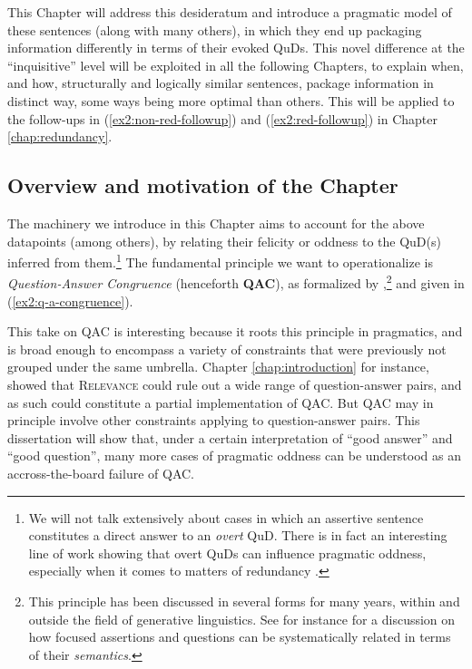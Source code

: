This Chapter will address this desideratum and introduce a pragmatic model of these sentences (along with many others), in which they end up packaging information differently in terms of their evoked QuDs. This novel difference at the ``inquisitive'' level will be exploited in all the following Chapters, to explain when, and how, structurally and logically similar sentences, package information in distinct way, some ways being more optimal than others. This will be applied to the follow-ups in (\ref{ex2:non-red-followup}) and (\ref{ex2:red-followup}) in Chapter \ref{chap:redundancy}.

\subsection{Overview  and motivation of the Chapter}
The machinery we introduce in this Chapter aims to account for the above datapoints (among others), by relating their felicity or oddness to the QuD(s) inferred from them.\footnote{We will not talk extensively about cases in which an assertive sentence constitutes a direct answer to an \textit{overt} QuD. There is in fact an interesting line of work showing that overt QuDs can influence pragmatic oddness, especially when it comes to matters of redundancy \citep{Haslinger2023}.} The fundamental principle we want to operationalize is \textit{Question-Answer Congruence} (henceforth \textbf{QAC}), as formalized by \citet{Katzir2015},\footnote{This principle has been discussed in several forms for many years, within and outside the field of generative linguistics. See for instance \citet{Rooth1992} for a discussion on how focused assertions and questions can be systematically related in terms of their \textit{semantics}.} and given in (\ref{ex2:q-a-congruence}). 

\begin{exe}
	\label{ex2:q-a-congruence}
\end{exe}

This take on QAC is interesting because it roots this principle in pragmatics, and is broad enough to encompass a variety of constraints that were previously not grouped under the same umbrella. Chapter \ref{chap:introduction} for instance, showed that \textsc{Relevance} could rule out a wide range of question-answer pairs, and as such could constitute a partial implementation of QAC. But QAC may in principle involve other constraints applying to question-answer pairs. This dissertation will show that, under a certain interpretation of ``good answer'' and ``good question'', many more cases of pragmatic oddness can be understood as an accross-the-board failure of QAC.

